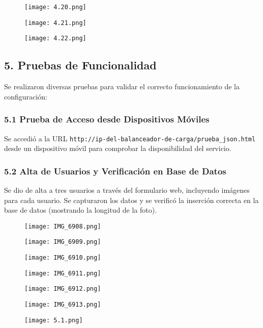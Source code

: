\documentclass[12pt]{article}
\begin{document}
\begin{figure}[H]
    \centering
    \texttt{[image: 4.20.png]}
\end{figure}
\begin{figure}[H]
    \centering
    \texttt{[image: 4.21.png]}
\end{figure}
\begin{figure}[H]
    \centering
    \texttt{[image: 4.22.png]}
\end{figure}

\subsection*{5. Pruebas de Funcionalidad}
Se realizaron diversas pruebas para validar el correcto funcionamiento de la configuración:

\subsubsection{5.1 Prueba de Acceso desde Dispositivos Móviles}
Se accedió a la URL \texttt{http://ip-del-balanceador-de-carga/prueba\_json.html} desde un dispositivo móvil para comprobar la disponibilidad del servicio.

\subsubsection{5.2 Alta de Usuarios y Verificación en Base de Datos}
Se dio de alta a tres usuarios a través del formulario web, incluyendo imágenes para cada usuario. Se capturaron los datos y se verificó la inserción correcta en la base de datos (mostrando la longitud de la foto).

\begin{figure}[H]
    \centering
    \texttt{[image: IMG\_6908.png]}
\end{figure}
\begin{figure}[H]
    \centering
    \texttt{[image: IMG\_6909.png]}
\end{figure}
\begin{figure}[H]
    \centering
    \texttt{[image: IMG\_6910.png]}
\end{figure}
\begin{figure}[H]
    \centering
    \texttt{[image: IMG\_6911.png]}
\end{figure}
\begin{figure}[H]
    \centering
    \texttt{[image: IMG\_6912.png]}
\end{figure}
\begin{figure}[H]
    \centering
    \texttt{[image: IMG\_6913.png]}
\end{figure}
\begin{figure}[H]
    \centering
    \texttt{[image: 5.1.png]}
\end{figure}
\end{document}
